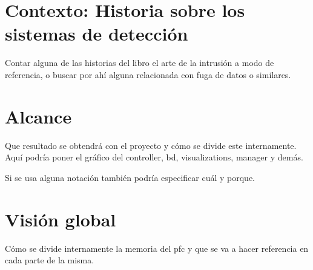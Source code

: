 \section{Contexto: Historia sobre los sistemas de detección}
Contar alguna de las historias del libro el arte de la intrusión a modo de referencia, o buscar por ahí alguna relacionada con fuga de datos o similares.

\section{Alcance}

Que resultado se obtendrá con el proyecto y cómo se divide este internamente. Aquí podría poner el gráfico del controller, bd, visualizations, manager y demás.

Si se usa alguna notación también podría especificar cuál y porque.

\section{Visión global}

Cómo se divide internamente la memoria del pfc y que se va a hacer referencia en cada parte de la misma.

